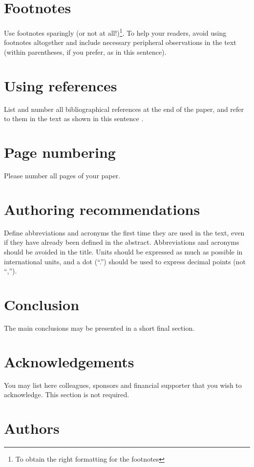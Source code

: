 \documentclass[a4paper,twocolumn]{article}
\begin{document}

\section{Footnotes}
\label{sec:sec7}
Use footnotes sparingly (or not at all!)\footnote{To obtain the right formatting for the footnotes}.
To help your readers, avoid using footnotes altogether and include necessary peripheral observations in the text (within parentheses, if you prefer, as in this sentence).


\section{Using references}
\label{sec:sec8}
List and number all bibliographical references at the end of the paper, and refer to them in the text as shown in this sentence \cite{author2021}.


\section{Page numbering}
\label{sec:sec9}
Please number all pages of your paper.


\section{Authoring recommendations}
\label{sec:sec10}
Define abbreviations and acronyms the first time they are used in the text, even if they have already been defined in the abstract.
Abbreviations and acronyms should be avoided in the title.
Units should be expressed as much as possible in international units, and a dot (``.'') should be used to express decimal points (not ``,'').


\section{Conclusion}
\label{sec:sec11}
The main conclusions may be presented in a short final section.


\section*{Acknowledgements}
\label{sec:ackn}
You may list here colleagues, sponsors and financial supporter that you wish to acknowledge.
This section is not required.


\printbibliography 


\section*{Authors}
\label{sec:auth}
\end{document}
